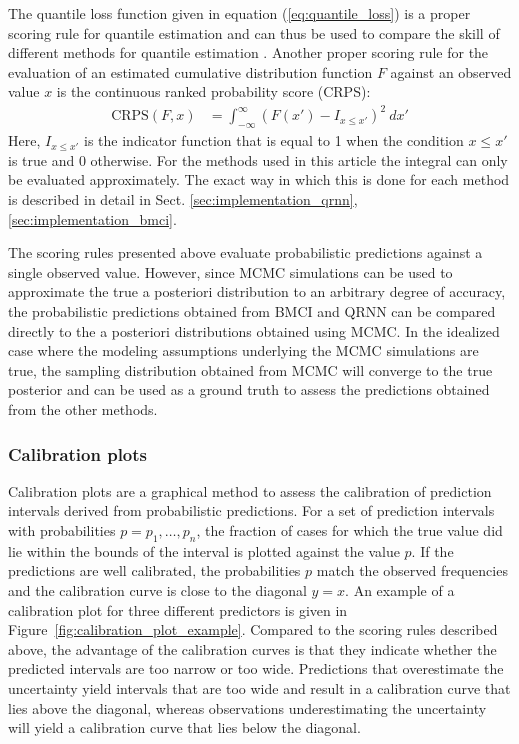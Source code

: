 \documentclass[journal abbreviation, manuscript]{copernicus}
\begin{document}
The quantile loss function given in equation (\ref{eq:quantile_loss}) is a
proper scoring rule for quantile estimation and can thus be used to compare the
skill of different methods for quantile estimation \citep{gneiting}. Another
proper scoring rule for the evaluation of an estimated cumulative distribution
function $F$ against an observed value $x$ is the continuous ranked probability
score (CRPS):
  \begin{align}\label{eq:crps}
    \text{CRPS}(F, x) &= \int_{-\infty}^{\infty} \left ( F(x') - I_{x \leq x'}
    \right )^2 \: dx'
  \end{align}
  Here, $I_{x \leq x'}$ is the indicator function that is equal to 1 when
  the condition $x \leq x'$ is true and $0$ otherwise.
  For the methods used in this article the integral can only be evaluated
  approximately. The exact way in which this is done for each method is
  described in detail in Sect. \ref{sec:implementation_qrnn},
  \ref{sec:implementation_bmci}.

  The scoring rules presented above evaluate probabilistic predictions against a
  single observed value. However, since MCMC simulations can be used to
  approximate the true a posteriori distribution to an arbitrary degree of
  accuracy, the probabilistic predictions obtained from BMCI and QRNN can be
  compared directly to the a posteriori distributions obtained using MCMC. In
  the idealized case where the modeling assumptions underlying the MCMC
  simulations are true, the sampling distribution obtained from MCMC will
  converge to the true posterior and can be used as a ground truth to assess the
  predictions obtained from the other methods.
  
\subsubsection{Calibration plots} 

Calibration plots are a graphical method to assess the calibration of prediction
intervals derived from probabilistic predictions. For a set of prediction
intervals with probabilities $p = p_1, \dots, p_n$, the fraction of cases
for which the true value did lie within the bounds of the interval is plotted
against the value $p$. If the predictions are well calibrated, the probabilities
$p$ match the observed frequencies and the calibration curve is close to the
diagonal $y = x$. An example of a calibration plot for three different
predictors is given in Figure~\ref{fig:calibration_plot_example}. Compared to the
scoring rules described above, the advantage of the calibration curves is that
they indicate whether the predicted intervals are too narrow or too wide.
Predictions that overestimate the uncertainty yield intervals that are too wide and
result in a calibration curve that lies above the diagonal, whereas observations
underestimating the uncertainty will yield a calibration curve that lies below
the diagonal.
\end{document}

